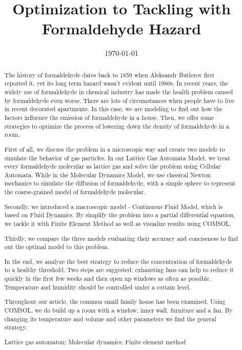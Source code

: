 \documentclass{mcmthesis}
\begin{document}
\title{Optimization to Tackling with Formaldehyde Hazard}

\date{\today}
	\begin{abstract}

		
The history of formaldehyde dates back to 1859 when Aleksandr Butlerov first reported it, yet its long term hazard wasn't evident until 1980s. In recent years, the widely use of formaldehyde in chemical industry has made the health problem caused by formaldehyde even worse. There are lots of circumstances when people have to live in recent decorated apartments. In this case, we are modeling to find out how the factors influence the emission of formaldehyde in a house. Then, we offer some strategies to optimize the process of lowering down the density of formaldehyde in a room. 

First of all, we discuss the problem in a microscopic way and create two models to simulate the behavior of gas particles. In our Lattice Gas Automata Model, we treat every formaldehyde molecular as lattice gas and solve the problem using Cellular Automata. While in the Molecular Dynamics Model, we use classical Newton mechanics to simulate the diffusion of formaldehyde, with a simple sphere to represent the coarse-grained model of formaldehyde molecular.

Secondly, we introduced a macroscopic model - Continuous Fluid Model, which is based on Fluid Dynamics. By simplify the problem into a partial differential equation, we tackle it with Finite Element Method as well as visualize results using COMSOL.

Thirdly, we compare the three models evaluating their accuracy and conciseness to find out the optimal model to this problem.

In the end, we analyze the best strategy to reduce the concentration of formaldehyde to a healthy threshold. Two steps are suggested: exhausting fans can help to reduce it quickly in the first few weeks and then open up windows as often as possible. Temperature and humidity should be controlled under a certain level.

Throughout our article, the common small family house has been examined. Using COMSOL, we do build up a room with a window, inner wall, furniture and a fan. By changing its temperature and volume and other parameters we find the general strategy.


        
		\begin{keywords}
			Lattice gas automaton; Molecular dynamics; Finite element method
		\end{keywords}
	\end{abstract}
\end{document}

